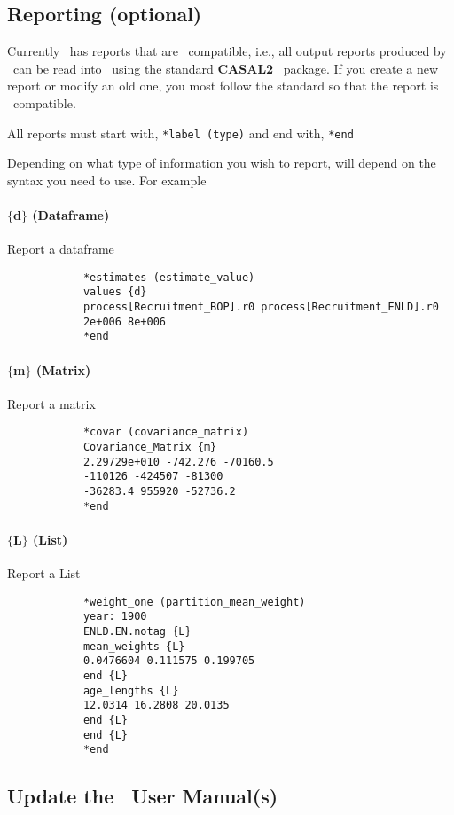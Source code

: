 \subsection{Reporting (optional)}

Currently \CNAME\ has reports that are \R\ compatible, i.e., all output reports produced by \CNAME\ can be read into \R\ using the standard  \textbf{CASAL2} \R\ package. If you create a new report or modify an old one, you most follow the standard so that the report is \R\ compatible.

All reports must start with,
\texttt{*label (type)}
and end with,
\texttt{*end}

Depending on what type of information you wish to report, will depend on the syntax you need to use. For example

\paragraph*{$\{$d$\}$ (Dataframe)}
Report a dataframe
{\small{\begin{verbatim}
			*estimates (estimate_value)
			values {d}
			process[Recruitment_BOP].r0 process[Recruitment_ENLD].r0 
			2e+006 8e+006
			*end
\end{verbatim}}}

\paragraph*{$\{$m$\}$ (Matrix)}
Report a matrix
{\small{\begin{verbatim}
			*covar (covariance_matrix)
			Covariance_Matrix {m}
			2.29729e+010 -742.276 -70160.5
			-110126 -424507 -81300 
			-36283.4 955920 -52736.2 
			*end
\end{verbatim}}}

\paragraph*{$\{$L$\}$ (List)}
Report a List
{\small{\begin{verbatim}
			*weight_one (partition_mean_weight)
			year: 1900
			ENLD.EN.notag {L}
			mean_weights {L}
			0.0476604 0.111575 0.199705
			end {L}
			age_lengths {L}
			12.0314 16.2808 20.0135
			end {L}
			end {L}
			*end
\end{verbatim}}}

\subsection{Update the \CNAME\ User Manual(s)}

